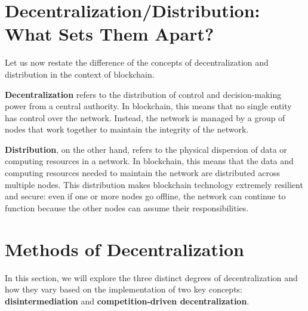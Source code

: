\section{Decentralization/Distribution: What Sets Them Apart?}

Let us now restate the difference of the concepts of decentralization and distribution in the context of blockchain.

\begin{outline}
\textbf{Decentralization} refers to the distribution of control and decision-making power from a central authority. In blockchain, this means that no single entity has control over the network. Instead, the network is managed by a group of nodes that work together to maintain the integrity of the network.

\textbf{Distribution}, on the other hand, refers to the physical dispersion of data or computing resources in a network. In blockchain, this means that the data and computing resources needed to maintain the network are distributed across multiple nodes. This distribution makes blockchain technology extremely resilient and secure: even if one or more nodes go offline, the network can continue to function because the other nodes can assume their responsibilities.
\end{outline}


\section{Methods of Decentralization}
In this section, we will explore the three distinct degrees of decentralization and how they vary based on the implementation of two key concepts: \textbf{disintermediation} and \textbf{competition-driven decentralization}. 

